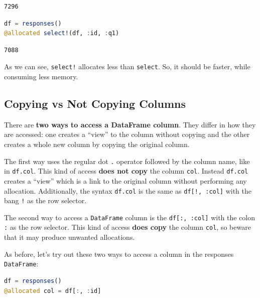 \documentclass[
  notoc %
]{tufte-book}
\newcommand{\passthrough}[1]{#1}
\begin{document}
\begin{lstlisting}
7296
\end{lstlisting}

\begin{lstlisting}[language=Julia]
df = responses()
@allocated select!(df, :id, :q1)
\end{lstlisting}

\begin{lstlisting}
7088
\end{lstlisting}

As we can see, \passthrough{\lstinline"select!"} allocates less than
\passthrough{\lstinline!select!}. So, it should be faster, while
consuming less memory.

\hypertarget{sec:df_performance_df_copy}{%
\subsection{Copying vs Not Copying
Columns}\label{sec:df_performance_df_copy}}

There are \textbf{two ways to access a DataFrame column}. They differ in
how they are accessed: one creates a ``view'' to the column without
copying and the other creates a whole new column by copying the original
column.

The first way uses the regular dot \passthrough{\lstinline!.!} operator
followed by the column name, like in \passthrough{\lstinline!df.col!}.
This kind of access \textbf{does not copy} the column
\passthrough{\lstinline!col!}. Instead \passthrough{\lstinline!df.col!}
creates a ``view'' which is a link to the original column without
performing any allocation. Additionally, the syntax
\passthrough{\lstinline!df.col!} is the same as
\passthrough{\lstinline"df[!, :col]"} with the bang
\passthrough{\lstinline"!"} as the row selector.

The second way to access a \passthrough{\lstinline!DataFrame!} column is
the \passthrough{\lstinline!df[:, :col]!} with the colon
\passthrough{\lstinline!:!} as the row selector. This kind of access
\textbf{does copy} the column \passthrough{\lstinline!col!}, so beware
that it may produce unwanted allocations.

As before, let's try out these two ways to access a column in the
responses \passthrough{\lstinline!DataFrame!}:

\begin{lstlisting}[language=Julia]
df = responses()
@allocated col = df[:, :id]
\end{lstlisting}
\end{document}
